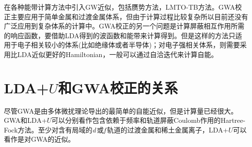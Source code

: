 在各种能带计算方法中引入GW近似，包括赝势方法\cite{PRB34-5390_1986}，LMTO-TB方法\cite{PRL74-3221_1995}。GWA校正主要应用于简单金属和过渡金属体系，但由于计算过程比较复杂所以目前还没有广泛应用到复杂体系的计算中。GWA校正的另一个问题是计算屏蔽相互作用所需的响应函数，要借助LDA得到的波函数和能带来计算得到\cite{JPCM9-767_1997}。但是这样的方法只适用于电子相关较小的体系(比如绝缘体或者半导体)；对电子强相关体系，则需要采用比LDA近似更好的Hamiltonian，一般可以通过自洽迭代来计算自能\cite{PRL74-3221_1995}。

\section{LDA+$U$和GWA校正的关系}
尽管GWA是由多体微扰理论导出的最简单的自能近似，但是计算量已经很大。GWA和LDA+$U$可以分别看作包含依赖于频率和轨道屏蔽Coulomb作用的Hartree-Fock方法。至少对含有局域的{\textit d}\,或{\textit f}\,轨道的过渡金属和稀土金属离子，LDA+$U$可以看作是对GWA的近似\cite{JPCM9-767_1997}。

